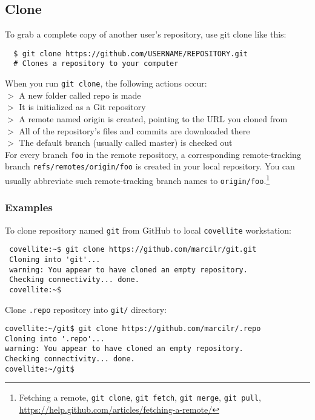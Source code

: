 \documentclass[12pt,letterpaper,dvips]{article}
\newcommand{\cmd}[1]{\texttt{#1}}
\begin{document}
\newpage
\subsection{Clone}
To grab a complete copy of another user's repository, use git clone like this:

\begin{Verbatim}
  $ git clone https://github.com/USERNAME/REPOSITORY.git
  # Clones a repository to your computer
\end{Verbatim}

\noindent When you run \cmd{git clone}, the following actions occur:\\
$>$ A new folder called repo is made\\
$>$ It is initialized as a Git repository\\
$>$ A remote named origin is created, pointing to the URL you cloned from\\
$>$ All of the repository's files and commits are downloaded there\\
$>$ The default branch (usually called master) is checked out\\

\noindent For every branch \cmd{foo} in the remote repository, a corresponding remote-tracking
branch \cmd{refs/remotes/origin/foo} is created in your local repository.  You can
usually abbreviate such remote-tracking branch names to \cmd{origin/foo}.\footnote{Fetching a remote,
\cmd{git clone}, \cmd{git fetch}, \cmd{git merge}, \cmd{git pull},
\href{https://help.github.com/articles/fetching-a-remote/}{https://help.github.com/articles/fetching-a-remote/}}


\subsubsection{Examples}
To clone repository named \cmd{git} from GitHub to local \cmd{covellite} workstation:
\begin{Verbatim}
 covellite:~$ git clone https://github.com/marcilr/git.git
 Cloning into 'git'...
 warning: You appear to have cloned an empty repository.
 Checking connectivity... done.
 covellite:~$
\end{Verbatim}

\newpage
\noindent Clone \cmd{.repo} repository into \cmd{git/} directory:
\begin{Verbatim}
covellite:~/git$ git clone https://github.com/marcilr/.repo
Cloning into '.repo'...
warning: You appear to have cloned an empty repository.
Checking connectivity... done.
covellite:~/git$
\end{Verbatim}
\end{document}

